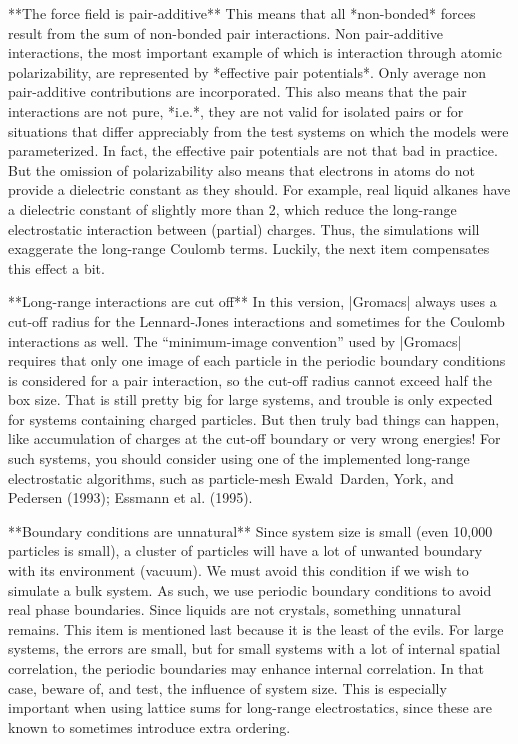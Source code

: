 **The force field is pair-additive**
      This means that all *non-bonded* forces result from the sum of
      non-bonded pair interactions. Non pair-additive interactions, the
      most important example of which is interaction through atomic
      polarizability, are represented by *effective pair potentials*.
      Only average non pair-additive contributions are incorporated.
      This also means that the pair interactions are not pure, *i.e.*,
      they are not valid for isolated pairs or for situations that
      differ appreciably from the test systems on which the models were
      parameterized. In fact, the effective pair potentials are not that
      bad in practice. But the omission of polarizability also means
      that electrons in atoms do not provide a dielectric constant as
      they should. For example, real liquid alkanes have a dielectric
      constant of slightly more than 2, which reduce the long-range
      electrostatic interaction between (partial) charges. Thus, the
      simulations will exaggerate the long-range Coulomb terms. Luckily,
      the next item compensates this effect a bit.

**Long-range interactions are cut off**
      In this version, |Gromacs| always uses a
      cut-off
      radius for the Lennard-Jones
      interactions and sometimes for the Coulomb interactions as well.
      The “minimum-image convention” used by |Gromacs| requires that only
      one image of each particle in the periodic boundary conditions is
      considered for a pair interaction, so the cut-off radius cannot
      exceed half the box size. That is still pretty big for large
      systems, and trouble is only expected for systems containing
      charged particles. But then truly bad things can happen, like
      accumulation of charges at the cut-off boundary or very wrong
      energies! For such systems, you should consider using one of the
      implemented long-range electrostatic algorithms, such as
      particle-mesh Ewald Darden, York, and Pedersen (1993); Essmann et
      al. (1995).

**Boundary conditions are unnatural**
      Since system size is small (even 10,000 particles is small), a
      cluster of particles will have a lot of unwanted boundary with its
      environment (vacuum). We must avoid this condition if we wish to
      simulate a bulk system. As such, we use periodic boundary
      conditions to avoid real phase boundaries. Since liquids are not
      crystals, something unnatural remains. This item is mentioned last
      because it is the least of the evils. For large systems, the
      errors are small, but for small systems with a lot of internal
      spatial correlation, the periodic boundaries may enhance internal
      correlation. In that case, beware of, and test, the influence of
      system size. This is especially important when using lattice sums
      for long-range electrostatics, since these are known to sometimes
      introduce extra ordering.

